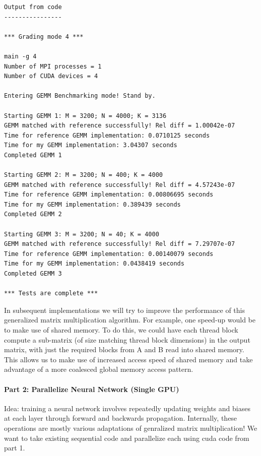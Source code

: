 \documentclass[12pt,letterpaper,twoside]{article}
\begin{document}
\begin{verbatim}
Output from code
----------------

*** Grading mode 4 ***

main -g 4
Number of MPI processes = 1
Number of CUDA devices = 4

Entering GEMM Benchmarking mode! Stand by.

Starting GEMM 1: M = 3200; N = 4000; K = 3136
GEMM matched with reference successfully! Rel diff = 1.00042e-07
Time for reference GEMM implementation: 0.0710125 seconds
Time for my GEMM implementation: 3.04307 seconds
Completed GEMM 1

Starting GEMM 2: M = 3200; N = 400; K = 4000
GEMM matched with reference successfully! Rel diff = 4.57243e-07
Time for reference GEMM implementation: 0.00806695 seconds
Time for my GEMM implementation: 0.389439 seconds
Completed GEMM 2

Starting GEMM 3: M = 3200; N = 40; K = 4000
GEMM matched with reference successfully! Rel diff = 7.29707e-07
Time for reference GEMM implementation: 0.00140079 seconds
Time for my GEMM implementation: 0.0438419 seconds
Completed GEMM 3

*** Tests are complete ***
\end{verbatim}

In subsequent implementations we will try to improve the performance of this 
generalized matrix multiplication algorithm. For example, one speed-up would be
to make use of shared memory. To do this, we could have each thread block compute
a sub-matrix (of size matching thread block dimensions) in the output matrix, with
just the required blocks from A and B read into shared memory. This allows us to 
make use of increased access speed of shared memory and take advantage of a more
coalesced global memory access pattern.


\paragraph{Part 2: Parallelize Neural Network (Single GPU)} Idea: training a neural
network involves repeatedly updating weights and biases at each layer through forward
and backwards propagation. Internally, these operations are mostly various adaptations
of genralized matrix multiplication! We want to take existing sequential code and 
parallelize each using cuda code from part 1.
\end{document}

